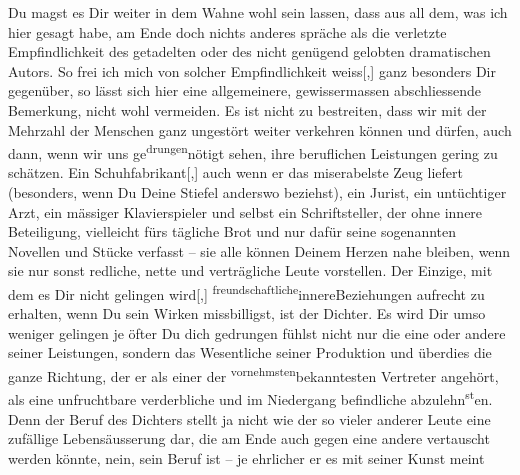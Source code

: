 \pstart
           Du magst es Dir weiter in dem Wahne wohl sein lassen, dass aus all dem, was ich hier
               gesagt habe, am Ende doch nichts anderes spräche als die verletzte Empfindlichkeit
               des getadelten oder des nicht genügend gelobten dramatischen Autors. So frei ich mich
               von solcher Empfindlichkeit weiss{[},{]} ganz besonders Dir gegenüber,
               so lässt sich hier eine \introOben{}allgemeinere\introOben{}, gewissermassen
               abschliessende Bemerkung, nicht wohl vermeiden. Es ist nicht zu bestreiten, dass wir
               mit der Mehrzahl der Menschen ganz ungestört weiter verkehren können und dürfen, auch
               dann, wenn wir uns ge\substVorne{}\textsuperscript{drungen}\substDazwischen{}nötigt\substHinten{} sehen, ihre beruflichen Leistungen gering zu schätzen. Ein
                  Schuhfabrikant{[},{]} auch wenn er das miserabelste Zeug liefert
               (besonders, wenn Du Deine Stiefel anderswo beziehst), ein \label{T_L03521-3v}\label{T_L03521-3} Jurist, ein untüchtiger Arzt,
               ein mässiger Klavierspieler und selbst ein Schriftsteller, der ohne innere
               Beteiligung, vielleicht fürs tägliche Brot und nur dafür seine sogenannten Novellen
               und Stücke verfasst – sie alle können Deinem Herzen nahe bleiben, wenn sie nur sonst
               redliche, nette und verträgliche Leute vorstellen. Der Einzige, mit dem es Dir nicht
               gelingen wird{[},{]}{ }\substVorne{}\textsuperscript{freundschaftliche}\substDazwischen{}innere\substHinten{}{ }{\pb}Beziehungen aufrecht zu erhalten,
               wenn Du sein Wirken missbilligst, ist der Dichter. Es wird Dir umso weniger gelingen
               je öfter Du \introOben{}dich gedrungen fühlst\introOben{} nicht nur die eine oder
               andere seiner Leistungen, sondern das Wesentliche seiner Produktion und überdies die
               ganze Richtung, der er als einer der \substVorne{}\textsuperscript{vornehmsten}\substDazwischen{}bekanntesten\substHinten{} Vertreter angehört, als eine unfruchtbare verderbliche und im Niedergang
               befindliche ab\introOben{}zu\introOben{}lehn\substVorne{}\textsuperscript{st}\substDazwischen{}en\substHinten{}. Denn der Beruf des Dichters stellt ja nicht wie der so vieler anderer Leute
               eine zufällige Lebensäusserung dar, die am Ende auch gegen eine andere vertauscht
               werden könnte, nein, sein Beruf ist – je ehrlicher er es mit seiner Kunst meint
